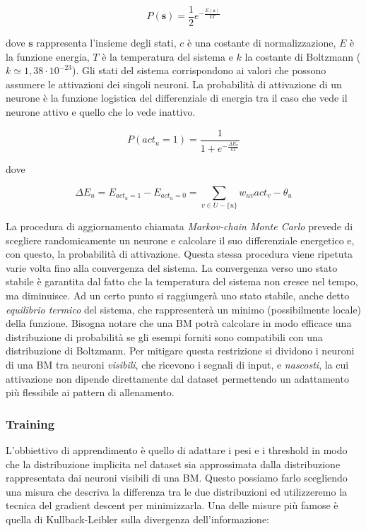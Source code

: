 \documentclass[10pt,a4paper]{article}
\begin{document}
$$
P(\mathbf{s}) = \frac{1}{2} e^{-\frac{E(\mathbf{s})}{kT}}
$$

dove $\mathbf{s}$ rappresenta l'insieme degli stati, $c$ è una costante di normalizzazione, $E$ è la funzione energia, $T$ è la temperatura del sistema e $k$ la costante di Boltzmann ($k \simeq 1,38 \cdot 10^{-23}$). Gli stati del sistema corrispondono ai valori che possono assumere le attivazioni dei singoli neuroni. La probabilità di attivazione di un neurone è la funzione logistica del differenziale di energia tra il caso che vede il neurone attivo e quello che lo vede inattivo.

$$
P(act_u = 1) = \frac{1}{1 + e^{-\frac{\Delta E_u}{kT}}}
$$

dove 

$$
\Delta E_u = E_{act_u = 1} - E_{act_u = 0} = \sum_{v \in U - \{u\}} w_{uv} act_v - \theta_u
$$
 
La procedura di aggiornamento chiamata \emph{Markov-chain Monte Carlo} prevede di scegliere randomicamente un neurone e calcolare il suo differenziale energetico e, con questo, la probabilità di attivazione. Questa stessa procedura  viene ripetuta varie volta fino alla convergenza del sistema. La convergenza verso uno stato stabile è garantita dal fatto che la temperatura del sistema non cresce nel tempo, ma diminuisce. Ad un certo punto si raggiungerà uno stato stabile, anche detto \emph{equilibrio termico} del sistema, che rappresenterà un minimo (possibilmente locale) della funzione.
Bisogna notare che una BM potrà calcolare in modo efficace una distribuzione di probabilità se gli esempi forniti sono compatibili con una distribuzione di Boltzmann. Per mitigare questa restrizione si dividono i neuroni di una BM tra neuroni \emph{visibili}, che ricevono i segnali di input, e \emph{nascosti}, la cui attivazione non dipende direttamente dal dataset permettendo un adattamento più flessibile ai pattern di allenamento. 

\subsubsection{Training}

L'obbiettivo di apprendimento è quello di adattare i pesi e i threshold in modo che la distribuzione implicita nel dataset sia approssimata dalla distribuzione rappresentata dai neuroni visibili di una BM. Questo possiamo farlo scegliendo una misura che descriva la differenza tra le due distribuzioni ed utilizzeremo la tecnica del gradient descent per minimizzarla. Una delle misure più famose è quella di Kullback-Leibler sulla divergenza dell'informazione:
\end{document}
